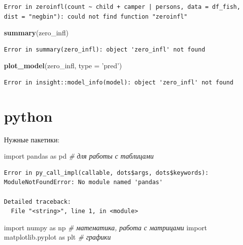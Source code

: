 \documentclass[]{book}
\newenvironment{Shaded}{\begin{snugshade}}{\end{snugshade}}
\newcommand{\CommentTok}[1]{\textcolor[rgb]{0.56,0.35,0.01}{\textit{#1}}}
\newcommand{\DataTypeTok}[1]{\textcolor[rgb]{0.13,0.29,0.53}{#1}}
\newcommand{\ImportTok}[1]{#1}
\newcommand{\KeywordTok}[1]{\textcolor[rgb]{0.13,0.29,0.53}{\textbf{#1}}}
\newcommand{\NormalTok}[1]{#1}
\newcommand{\StringTok}[1]{\textcolor[rgb]{0.31,0.60,0.02}{#1}}
\begin{document}
\begin{verbatim}
Error in zeroinfl(count ~ child + camper | persons, data = df_fish, dist = "negbin"): could not find function "zeroinfl"
\end{verbatim}

\begin{Shaded}
\begin{Highlighting}[]
\KeywordTok{summary}\NormalTok{(zero_infl)}
\end{Highlighting}
\end{Shaded}

\begin{verbatim}
Error in summary(zero_infl): object 'zero_infl' not found
\end{verbatim}

\begin{Shaded}
\begin{Highlighting}[]
\KeywordTok{plot_model}\NormalTok{(zero_infl, }\DataTypeTok{type =} \StringTok{'pred'}\NormalTok{)}
\end{Highlighting}
\end{Shaded}

\begin{verbatim}
Error in insight::model_info(model): object 'zero_infl' not found
\end{verbatim}

\hypertarget{python-1}{%
\section{python}\label{python-1}}

Нужные пакетики:

\begin{Shaded}
\begin{Highlighting}[]
\ImportTok{import}\NormalTok{ pandas }\ImportTok{as}\NormalTok{ pd }\CommentTok{# для работы с таблицами}
\end{Highlighting}
\end{Shaded}

\begin{verbatim}
Error in py_call_impl(callable, dots$args, dots$keywords): ModuleNotFoundError: No module named 'pandas'

Detailed traceback: 
  File "<string>", line 1, in <module>
\end{verbatim}

\begin{Shaded}
\begin{Highlighting}[]
\ImportTok{import}\NormalTok{ numpy }\ImportTok{as}\NormalTok{ np }\CommentTok{# математика, работа с матрицами}
\ImportTok{import}\NormalTok{ matplotlib.pyplot }\ImportTok{as}\NormalTok{ plt }\CommentTok{# графики}
\end{Highlighting}
\end{Shaded}
\end{document}
